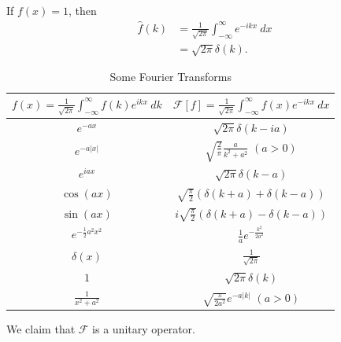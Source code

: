 \documentclass[10pt]{mypackage}
\begin{document}
\begin{example}
  If $f(x) = 1$, then
  \begin{align*}
    \widehat{f}(k) &= \frac{1}{\sqrt{2\pi}}\int_{-\infty}^{\infty} e^{-ikx}\:dx\\
               &= \sqrt{2\pi}\delta\left(k\right).
  \end{align*}
  
\end{example}

\begin{table}
  \centering
  \renewcommand{\arraystretch}{2}
  \begin{tabular}{c|c}
    $\displaystyle f(x) = \frac{1}{\sqrt{2\pi}}\int_{-\infty}^{\infty} f(k)e^{ikx}\:dk$ & $\displaystyle \mathcal{F}\left[f\right] = \frac{1}{\sqrt{2\pi}}\int_{-\infty}^{\infty} f(x)e^{-ikx}\:dx$\\
    \hline\hline
    $\displaystyle e^{-ax}$ & $\displaystyle \sqrt{2\pi}\delta\left(k-ia\right)$\\
    $\displaystyle e^{-a|x|}$ & $\displaystyle \sqrt{\frac{2}{\pi}}\frac{a}{k^2 + a^2}$ $(a > 0)$\\
    $\displaystyle e^{iax}$ & $\displaystyle \sqrt{2\pi}\delta\left(k-a\right)$\\
    $\displaystyle \cos\left(ax\right)$ & $\displaystyle \sqrt{\frac{\pi}{2}}\left(\delta\left(k+a\right) + \delta\left(k-a\right)\right)$\\
    $\displaystyle \sin\left(ax\right)$ & $\displaystyle i\sqrt{\frac{\pi}{2}}\left(\delta\left(k+a\right) - \delta\left(k-a\right)\right)$\\
    $\displaystyle e^{-\frac{1}{2}a^2x^2}$ & $\displaystyle \frac{1}{a}e^{-\frac{k^2}{2a^2}}$\\
    $\displaystyle \delta\left(x\right)$ & $\displaystyle \frac{1}{\sqrt{2\pi}}$\\
    $1$ & $\displaystyle \sqrt{2\pi}\delta\left(k\right)$\\
    $\displaystyle \frac{1}{x^2 + a^2}$ & $\displaystyle \sqrt{\frac{\pi}{2a^2}}e^{-a|k|}$ $(a > 0)$
  \end{tabular}
  \caption{Some Fourier Transforms}
\end{table}
We claim that $\mathcal{F}$ is a unitary operator.
\end{document}
